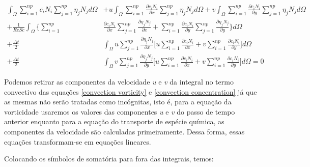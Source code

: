 \medskip
\begin{equation} \label{convection concentration}
 \begin{aligned} 
  \int_{\Omega} \sum\limits_{i=1}^{np} \overset{.}{c_i} N_i 
                \sum\limits_{j=1}^{np} \eta_j N_j d\Omega 
  & + u \int_{\Omega} \sum\limits_{i=1}^{np} \frac{\partial c_i N_i}{\partial x} 
                    \sum\limits_{j=1}^{np} \eta_j N_j d\Omega 
  + v \int_{\Omega} \sum\limits_{i=1}^{np} \frac{\partial c_i N_i}{\partial y} 
                    \sum\limits_{j=1}^{np} \eta_j N_j d\Omega 
  \\[5pt]
  + \frac{1}{\textit{ReSc}} \int_{\Omega} \Bigg\{ 
                    \sum\limits_{i=1}^{np} & \frac{\partial c_i N_i}{\partial x} 
                    \sum\limits_{j=1}^{np} \frac{\partial \eta_j N_j}{\partial x} 
  +                 \sum\limits_{i=1}^{np} \frac{\partial c_i N_i}{\partial y} 
                    \sum\limits_{j=1}^{np} \frac{\partial \eta_j N_j}{\partial y} \Bigg\} d\Omega
 \\[5pt]
 + \frac{\Delta t}{2} & \int_{\Omega} u \sum\limits_{j=1}^{np} \frac{\partial \eta_j N_j}{\partial x}
 \Bigg[
   u \sum\limits_{i=1}^{np} \frac{\partial c_i N_i}{\partial x}
 + v \sum\limits_{i=1}^{np} \frac{\partial c_i N_i}{\partial y}
 \Bigg] d\Omega
 \\[5pt] 
 + \frac{\Delta t}{2} & \int_{\Omega} v \sum\limits_{j=1}^{np} \frac{\partial \eta_j N_j}{\partial y}
 \Bigg[
   u \sum\limits_{i=1}^{np} \frac{\partial c_i N_i}{\partial x}
 + v \sum\limits_{i=1}^{np} \frac{\partial c_i N_i}{\partial y}
 \Bigg] d\Omega = 0
 \end{aligned}
\end{equation}

\noindent
Podemos retirar as componentes da velocidade \textit{u} e \textit{v} da integral 
no termo convectivo das equações \ref{convection vorticity} e \ref{convection concentration}
já que as mesmas não serão tratadas como incógnitas, isto é, para a equação da vorticidade
usaremos os valores das componentes \textit{u} e \textit{v} do passo de tempo
anterior enquanto para a equação do transporte de espécie química, as componentes da velocidade
são calculadas primeiramente. Dessa forma, essas equações transformam-se
em equações lineares. 

\medskip
\noindent
Colocando os símbolos de somatória para fora
das integrais, temos:

